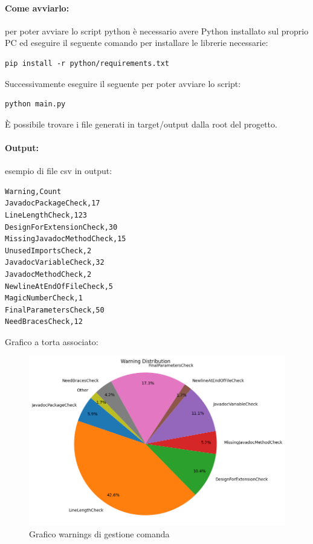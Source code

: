 \paragraph{Come avviarlo:}
per poter avviare lo script python è necessario avere Python installato sul proprio PC\cite{phoenixnap} ed eseguire il seguente comando per installare le librerie necessarie:
\begin{lstlisting}[style=terminal, 
	caption={Python - installare i pacchetti necessari}, label=lst:python-pip-install]
pip install -r python/requirements.txt
\end{lstlisting}
Successivamente eseguire il seguente per poter avviare lo script:
\begin{lstlisting}[style=terminal, 
	caption={Avvio script python}, label=lst:python-main]
python main.py
\end{lstlisting}
È possibile trovare i file generati in target/output dalla root del progetto.
\paragraph{Output:}
esempio di file csv in output:
\begin{lstlisting}[style=pythonstyle, caption={file checkstyle\_warning\_severity\_counts.csv warning di gestione comanda}, label=lst:csv-warning]
Warning,Count
JavadocPackageCheck,17
LineLengthCheck,123
DesignForExtensionCheck,30
MissingJavadocMethodCheck,15
UnusedImportsCheck,2
JavadocVariableCheck,32
JavadocMethodCheck,2
NewlineAtEndOfFileCheck,5
MagicNumberCheck,1
FinalParametersCheck,50
NeedBracesCheck,12
\end{lstlisting}
Grafico a torta associato:
\begin{figure}[htbp]
	\centering
	\includegraphics[scale=0.6]{iterazione1/images/warning_severity_distribution_pie_chart.png}
	\caption{Grafico warnings di gestione comanda\label{fig:graph_warning_gestionecomanda}}
\end{figure}

\clearpage